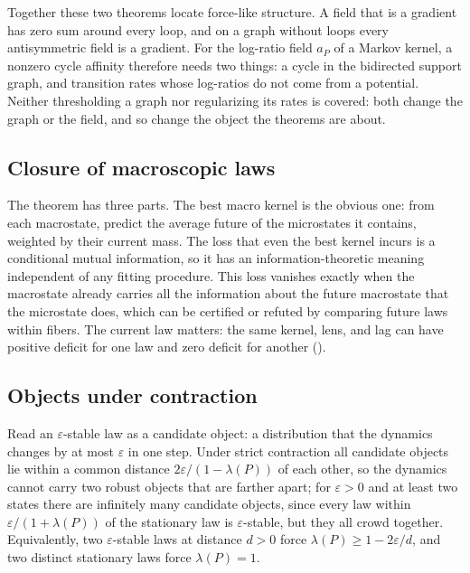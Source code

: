 \begin{theorem}\label{thm:NG_FORCE_NULL}
\ThmStmtNGFORCENULL
\end{theorem}

Together these two theorems locate force-like structure.
A field that is a gradient has zero sum around every loop, and on a graph without loops every antisymmetric field is a gradient.
For the log-ratio field $a_P$ of a Markov kernel, a nonzero cycle affinity therefore needs two things: a cycle in the bidirected support graph, and transition rates whose log-ratios do not come from a potential.
Neither thresholding a graph nor regularizing its rates is covered: both change the graph or the field, and so change the object the theorems are about.

\subsection*{Closure of macroscopic laws}

\begin{theorem}\label{thm:NG_MACRO_CLOSURE_DEFICIT}
\ThmStmtNGMACROCLOSUREDEFICIT
\end{theorem}

The theorem has three parts.
The best macro kernel is the obvious one: from each macrostate, predict the average future of the microstates it contains, weighted by their current mass.
The loss that even the best kernel incurs is a conditional mutual information, so it has an information-theoretic meaning independent of any fitting procedure.
This loss vanishes exactly when the macrostate already carries all the information about the future macrostate that the microstate does, which can be certified or refuted by comparing future laws within fibers.
The current law matters: the same kernel, lens, and lag can have positive deficit for one law and zero deficit for another ().

\subsection*{Objects under contraction}

\begin{theorem}\label{thm:NG_OBJECT_CONTRACTIVE}
\ThmStmtNGOBJECTCONTRACTIVE
\end{theorem}

Read an $\varepsilon$-stable law as a candidate object: a distribution that the dynamics changes by at most $\varepsilon$ in one step.
Under strict contraction all candidate objects lie within a common distance $2\varepsilon/(1-\lambda(P))$ of each other, so the dynamics cannot carry two robust objects that are farther apart; for $\varepsilon>0$ and at least two states there are infinitely many candidate objects, since every law within $\varepsilon/(1+\lambda(P))$ of the stationary law is $\varepsilon$-stable, but they all crowd together.
Equivalently, two $\varepsilon$-stable laws at distance $d>0$ force $\lambda(P)\ge 1-2\varepsilon/d$, and two distinct stationary laws force $\lambda(P)=1$.

